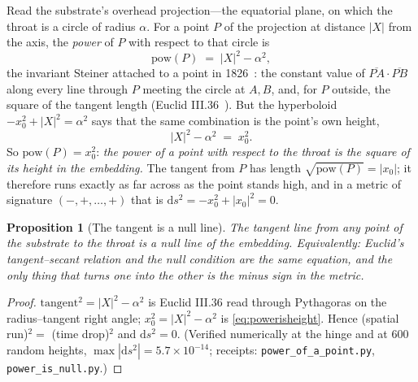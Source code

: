 \documentclass[11pt,a4paper]{article}
\newtheorem{proposition}[theorem]{Proposition}
\theoremstyle{definition}
\begin{document}
Read the substrate's overhead projection---the equatorial plane, on which the
throat is a circle of radius $\alpha$. For a point $P$ of the projection at
distance $|X|$ from the axis, the \emph{power} of $P$ with respect to that
circle is
\begin{equation}\label{eq:power}
\mathrm{pow}(P)\;=\;|X|^{2}-\alpha^{2},
\end{equation}
the invariant Steiner attached to a point in 1826~\cite{Steiner1826}: the
constant value of $\overline{PA}\cdot\overline{PB}$ along every line through
$P$ meeting the circle at $A,B$, and, for $P$ outside, the square of the tangent
length (Euclid III.36~\cite{Euclid}). But the hyperboloid
$-x_{0}^{2}+|X|^{2}=\alpha^{2}$ says that the same combination is the point's
own height,
\begin{equation}\label{eq:powerisheight}
|X|^{2}-\alpha^{2}\;=\;x_{0}^{2}.
\end{equation}
So $\mathrm{pow}(P)=x_{0}^{2}$: \emph{the power of a point with respect to the
throat is the square of its height in the embedding.} The tangent from $P$ has
length $\sqrt{\mathrm{pow}(P)}=|x_{0}|$; it therefore runs exactly as far across
as the point stands high, and in a metric of signature $(-,+,\dots,+)$ that is
$\mathrm{d}s^{2}=-x_{0}^{2}+|x_{0}|^{2}=0$.

\begin{proposition}[The tangent is a null line]\label{prop:tangentnull}
The tangent line from any point of the substrate to the throat is a null line of
the embedding. Equivalently: Euclid's tangent--secant relation and the null
condition are the same equation, and the only thing that turns one into the
other is the minus sign in the metric.
\end{proposition}

\begin{proof}
$\mathrm{tangent}^{2}=|X|^{2}-\alpha^{2}$ is Euclid III.36 read through
Pythagoras on the radius--tangent right angle; $x_{0}^{2}=|X|^{2}-\alpha^{2}$ is
\eqref{eq:powerisheight}. Hence (spatial run)$^{2}=$ (time drop)$^{2}$ and
$\mathrm{d}s^{2}=0$. (Verified numerically at the hinge and at $600$ random
heights, $\max|\mathrm{d}s^{2}|=5.7\times10^{-14}$; receipts:
\texttt{power\_of\_a\_point.py}, \texttt{power\_is\_null.py}.)
\end{proof}
\end{document}
